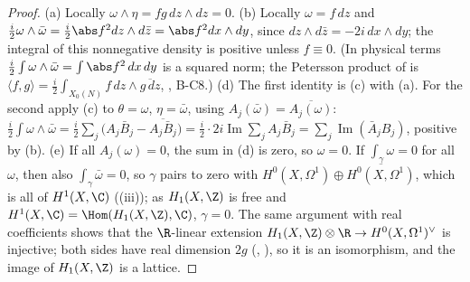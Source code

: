 \begin{proof}
(a) Locally $\omega\wedge\eta=fg\,dz\wedge dz=0$. (b) Locally $\omega=f\,dz$ and $\frac i2\omega\wedge\bar\omega=\frac i2\abs f^2dz\wedge d\bar z=\abs f^2dx\wedge dy$, since $dz\wedge d\bar z=-2i\,dx\wedge dy$;
the integral of this nonnegative density is positive unless $f\equiv0$. (In physical terms $\frac i2\int\omega\wedge\bar\omega=\int\abs f^2\,dx\,dy$ is a squared norm; the Petersson
product of  is $\langle f,g\rangle=\frac i2\int_{X_0(N)}f\,dz\wedge\overline{g\,dz}$, , B-C8.)
(d) The first identity is (c) with (a). For the second apply (c) to $\theta=\omega$, $\eta=\bar\omega$, using $A_j(\bar\omega)=\overline{A_j(\omega)}$:
$\frac i2\int\omega\wedge\bar\omega=\frac i2\sum_j\bigl(A_j\bar B_j-\overline{A_j\bar B_j}\bigr)=\frac i2\cdot2i\operatorname{Im}\sum_jA_j\bar B_j=\sum_j\operatorname{Im}(\bar A_jB_j)$, positive by (b).
(e) If all $A_j(\omega)=0$, the sum in (d) is zero, so $\omega=0$. If $\int_\gamma\omega=0$ for all $\omega$, then also $\int_\gamma\bar\omega=0$, so $\gamma$ pairs to zero with
$H^0(X,\Omega^1)\oplus\overline{H^0(X,\Omega^1)}$, which is all of $H^1(X,\C)$ ((iii)); as $H_1(X,\Z)$ is free and $H^1(X,\C)=\Hom(H_1(X,\Z),\C)$,
$\gamma=0$. The same argument with real coefficients shows that the $\R$-linear extension $H_1(X,\Z)\otimes\R\to H^0(X,\Omega^1)^\vee$ is injective; both sides have real dimension
$2g$ (, ), so it is an isomorphism, and the image of $H_1(X,\Z)$ is a lattice.
\end{proof}

